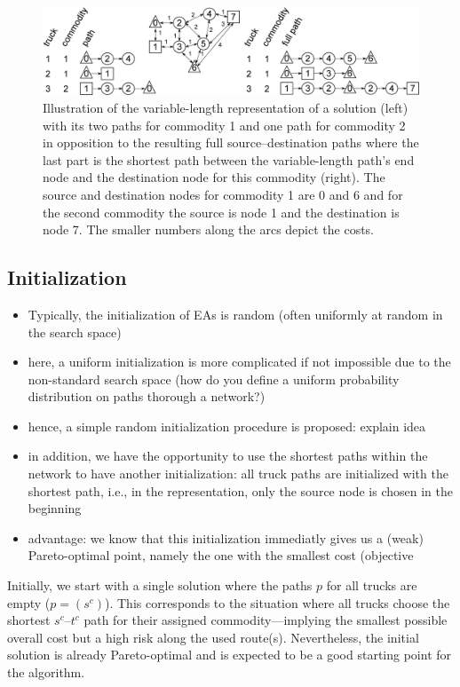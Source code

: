 \documentclass[preprint,12pt]{elsarticle}
\begin{document}
\begin{figure}%
\includegraphics[width=\columnwidth]{figs/truckpaths}%
\caption{\label{fig:paths} Illustration of the variable-length representation of a solution (left) with its two paths for commodity 1 and one path for commodity 2 in opposition to the resulting full source--destination paths where the last part is the shortest path between the variable-length path's end node and the destination node for this commodity (right). The source and destination nodes for commodity 1 are 0 and 6 and for the second commodity the source is node 1 and the destination is node 7. The smaller numbers along the arcs depict the costs.}
\end{figure}


\subsection{Initialization}\label{sec:init}
\begin{itemize}
	\item Typically, the initialization of EAs is random (often uniformly at random in the search space)
	\item here, a uniform initialization is more complicated if not impossible due to the non-standard search space (how do you define a uniform probability distribution on paths thorough a network?)
	\item hence, a simple random initialization procedure is proposed: explain idea
	\item in addition, we have the opportunity to use the shortest paths within the network to have another initialization: all truck paths are initialized with the shortest path, i.e., in the representation, only the source node is chosen in the beginning
	\item advantage: we know that this initialization immediatly gives us a (weak) Pareto-optimal point, namely the one with the smallest cost (objective 
\end{itemize}

Initially, we start with a single solution where the paths $p$ for all trucks are empty ($p=(s^c)$). This corresponds to the situation where all trucks choose the shortest $s^c$--$t^c$ path for their assigned commodity---implying the smallest possible overall cost but a high risk along the used route(s). Nevertheless, the initial solution is already Pareto-optimal and is expected to be a good starting point for the algorithm.
\end{document}
